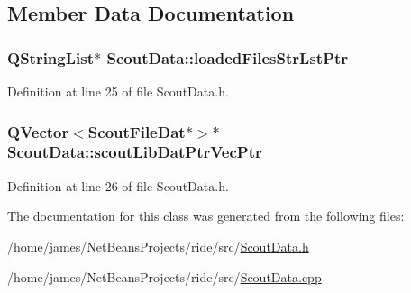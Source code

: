\subsection{Member Data Documentation}
\hypertarget{class_scout_data_a72963d54f28d1ed0f85f97195999006d}{
\subsubsection[{loaded\-Files\-Str\-Lst\-Ptr}]{\setlength{\rightskip}{0pt plus 5cm}Q\-String\-List$\ast$ Scout\-Data\-::loaded\-Files\-Str\-Lst\-Ptr\hspace{0.3cm}{\ttfamily [private]}}}\label{class_scout_data_a72963d54f28d1ed0f85f97195999006d}


Definition at line 25 of file Scout\-Data.\-h.

\hypertarget{class_scout_data_a810e161f9630a24b4b11f61cda96980a}{
\subsubsection[{scout\-Lib\-Dat\-Ptr\-Vec\-Ptr}]{\setlength{\rightskip}{0pt plus 5cm}Q\-Vector$<${\bf Scout\-File\-Dat}$\ast$$>$$\ast$ Scout\-Data\-::scout\-Lib\-Dat\-Ptr\-Vec\-Ptr\hspace{0.3cm}{\ttfamily [private]}}}\label{class_scout_data_a810e161f9630a24b4b11f61cda96980a}


Definition at line 26 of file Scout\-Data.\-h.



The documentation for this class was generated from the following files\-:\begin{DoxyCompactItemize}
\item 
/home/james/\-Net\-Beans\-Projects/ride/src/\hyperlink{_scout_data_8h}{Scout\-Data.\-h}\item 
/home/james/\-Net\-Beans\-Projects/ride/src/\hyperlink{_scout_data_8cpp}{Scout\-Data.\-cpp}\end{DoxyCompactItemize}
